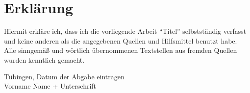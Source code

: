 
\thispagestyle{empty}
\section*{Erklärung}
{\RaggedRight
Hiermit erkläre ich, dass ich die vorliegende Arbeit 
\enquote{Titel}
selbstständig verfasst und keine anderen als die angegebenen Quellen und Hilfsmittel benutzt habe.
Alle sinngemäß und wörtlich übernommenen Textstellen aus fremden Quellen wurden kenntlich gemacht.\par}%
\vspace{5em}

Tübingen, Datum der Abgabe eintragen		\\[2em]
Vorname Name + Unterschrift


\cleardoubleoddpage

